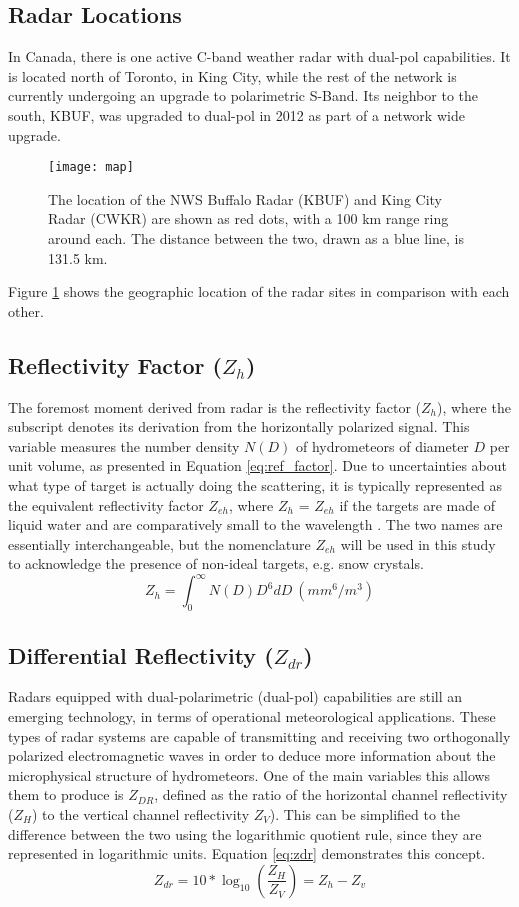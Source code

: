\subsection{Radar Locations}
In Canada, there is one active C-band weather radar with dual-pol capabilities. It is located north of Toronto, in King City, while the rest of the network is
currently undergoing an upgrade to polarimetric S-Band. Its neighbor to the south, KBUF, was upgraded to dual-pol in 2012 as part of a network wide upgrade. 
\begin{figure}[h]
\texttt{[image: map]}
\caption{The location of the NWS Buffalo Radar (KBUF) and King City Radar (CWKR) are shown as red dots, with a 100 km range ring around each. The distance
between the two, drawn as a blue line, is 131.5 km.} 
\label{map}
\end{figure}
Figure \ref{map} shows the geographic location of the radar sites in comparison with each other.
\subsection{Reflectivity Factor ($Z_{h}$)}
The foremost moment derived from radar is the reflectivity factor ($Z_{h}$), where the
subscript denotes its derivation from the horizontally polarized signal. This variable
measures the number density $N(D)$ of hydrometeors of diameter $D$ per unit volume, as
presented in Equation \ref{eq:ref_factor}. Due to uncertainties about what type of
target is actually doing the scattering, it is typically represented as the equivalent
reflectivity factor $Z_{eh}$, where $Z_{h}$ = $Z_{eh}$ if the targets are made of liquid 
water and are comparatively small to the wavelength \citep{Fabry2015}. The two names are 
essentially interchangeable, but the nomenclature $Z_{eh}$ will be used in this study to 
acknowledge the presence of non-ideal targets, e.g. snow crystals.
\begin{equation}\label{eq:ref_factor}
Z_{h} = \int_0^{\infty} N(D)D^6dD \ (mm^6/m^3)
\end{equation}
\subsection{Differential Reflectivity ($Z_{dr}$)}
Radars equipped with dual-polarimetric (dual-pol) capabilities are still an emerging technology, in terms of operational meteorological applications. These
types of radar systems are capable of transmitting and receiving two orthogonally polarized electromagnetic waves in order to deduce more information about
the microphysical structure of hydrometeors. One of the main variables this allows them to produce is $Z_{DR}$, defined as the ratio of the horizontal
channel reflectivity ($Z_H$) to the vertical channel reflectivity $Z_{V}$). This can be simplified to the difference between the two using the logarithmic
quotient rule, since they are represented in logarithmic units. Equation \ref{eq:zdr} demonstrates this concept.
\begin{equation}\label{eq:zdr}
Z_{dr} = 10 * \log_{10}(\frac{Z_H}{Z_V}) = Z_h - Z_v
\end{equation}
